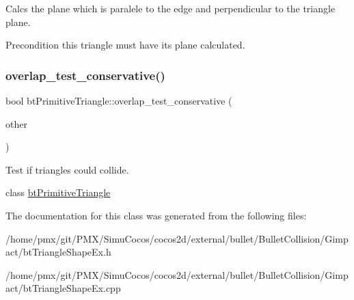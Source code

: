 Calcs the plane which is paralele to the edge and perpendicular to the triangle plane. 

\begin{DoxyPrecond}{Precondition}
this triangle must have its plane calculated. 
\end{DoxyPrecond}
\mbox{\label{classbtPrimitiveTriangle_a844b5c15a34e656e64135f43a8d27d53}} 
\subsubsection{\texorpdfstring{overlap\+\_\+test\+\_\+conservative()}{overlap\_test\_conservative()}}
{\footnotesize\ttfamily bool bt\+Primitive\+Triangle\+::overlap\+\_\+test\+\_\+conservative (\begin{DoxyParamCaption}\item[{const \hyperlink{classbtPrimitiveTriangle}{bt\+Primitive\+Triangle} \&}]{other }\end{DoxyParamCaption})}



Test if triangles could collide. 

class \hyperlink{classbtPrimitiveTriangle}{bt\+Primitive\+Triangle} 

The documentation for this class was generated from the following files\+:\begin{DoxyCompactItemize}
\item 
/home/pmx/git/\+P\+M\+X/\+Simu\+Cocos/cocos2d/external/bullet/\+Bullet\+Collision/\+Gimpact/bt\+Triangle\+Shape\+Ex.\+h\item 
/home/pmx/git/\+P\+M\+X/\+Simu\+Cocos/cocos2d/external/bullet/\+Bullet\+Collision/\+Gimpact/bt\+Triangle\+Shape\+Ex.\+cpp\end{DoxyCompactItemize}
